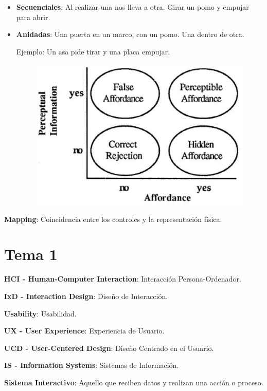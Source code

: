 \documentclass[12pt]{report} %
\begin{document}
\begin{itemize}
\item
  \textbf{Secuenciales}: Al realizar una nos lleva a otra. Girar un pomo
  y empujar para abrir.
\item
  \textbf{Anidadas}: Una puerta en un marco, con un pomo. Una dentro de
  otra.

  Ejemplo: Un asa pide tirar y una placa empujar.
  \begin{figure}[H]
	{\includegraphics[scale=.4]{Untitled.png}}
\end{figure}
\end{itemize}

\textbf{Mapping}: Coincidencia entre los controles y la representación
física.

\chapter{Tema 1}

\textbf{HCI - Human-Computer Interaction}: Interacción
Persona-Ordenador.

\textbf{IxD - Interaction Design}: Diseño de Interacción.

\textbf{Usability}: Usabilidad.

\textbf{UX - User Experience}: Experiencia de Usuario.

\textbf{UCD - User-Centered Design}: Diseño Centrado en el Usuario.

\textbf{IS - Information Systems}: Sistemas de Información.

\textbf{Sistema Interactivo}: Aquello que reciben datos y realizan una
acción o proceso.
\end{document}

